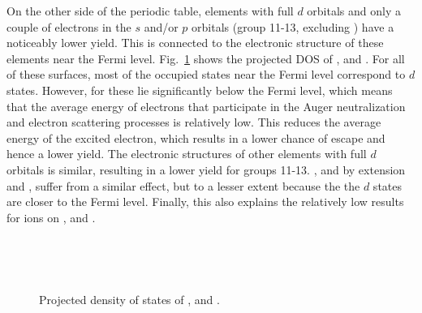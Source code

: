\begin{refsection}
On the other side of the periodic table, elements with full $d$ orbitals and 
only a couple of electrons in the $s$ and/or $p$ orbitals (group 11-13, 
excluding ) have a noticeably lower yield. This is connected to the 
electronic structure of these elements near the Fermi level. Fig.~\ref{quotas:fig-pdos} 
shows the projected \gls{DOS} of ,  and . 
For all of these surfaces, most of the occupied states near the Fermi level 
correspond to $d$ states. However, for  these 
lie significantly below the Fermi level, which means that the average energy of electrons that 
participate in the Auger neutralization and electron scattering processes is 
relatively low. This reduces the average energy of the excited electron, 
which results in a lower chance of escape and hence a lower yield. The electronic  structures of 
other elements with full $d$ orbitals is similar, resulting in a lower yield 
for groups 11-13. , and by extension  and , suffer from a
similar effect, but to a lesser extent because the 
the $d$ states are closer to the Fermi level. Finally, this also explains the relatively low results for  ions on ,  and . 

{
\begin{figure}[ht] 
    \centering
    \captionsetup{width=0.9\textwidth}
    \begin{subfigure}[t]{0.33\textwidth} 
        \centering 
        
    \end{subfigure}%
    ~  
    \begin{subfigure}[t]{0.29\textwidth} 
        \centering 
        
    \end{subfigure} 
    ~
    \begin{subfigure}[t]{0.29\textwidth}
        \centering 
          
    \end{subfigure}
    \caption{\label{quotas:fig-pdos}Projected density of states of ,  and .} 
\end{figure}
}
 

\end{refsection}
